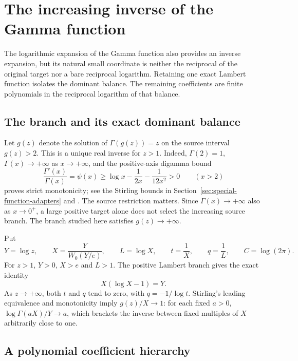 \section{The increasing inverse of the Gamma function}
\label{sec:gamma-inverse}

The logarithmic expansion of the Gamma function also provides an inverse
expansion, but its natural small coordinate is neither the reciprocal of
the original target nor a bare reciprocal logarithm. Retaining one exact
Lambert function isolates the dominant balance. The remaining coefficients
are finite polynomials in the reciprocal logarithm of that balance.

\subsection{The branch and its exact dominant balance}

Let $g(z)$ denote the solution of $\Gamma(g(z))=z$ on the source interval
$g(z)>2$. This is a unique real inverse for $z>1$. Indeed, $\Gamma(2)=1$,
$\Gamma(x)\to+\infty$ as $x\to+\infty$, and the positive-axis digamma bound
\[
 \frac{\Gamma'(x)}{\Gamma(x)}=\psi(x)
 \ge \log x-\frac1{2x}-\frac1{12x^2}>0\qquad(x>2)
\]
proves strict monotonicity; see the Stirling bounds in
Section~\ref{sec:special-function-adapters} and \cite[\S5.11]{dlmf}.
The source restriction matters. Since $\Gamma(x)\to+\infty$ also as
$x\to0^+$, a large positive target alone does not select the increasing
source branch. The branch studied here satisfies $g(z)\to+\infty$.

Put
\begin{equation}
 Y=\log z,\qquad
 X=\frac{Y}{W_0(Y/e)},\qquad L=\log X,\qquad
 t=\frac1X,\qquad q=\frac1L,\qquad C=\log(2\pi).
 \label{eq:gamma-inverse-coordinate}
\end{equation}
For $z>1$, $Y>0$, $X>e$ and $L>1$. The positive Lambert branch gives
the exact identity
\[
 X(\log X-1)=Y.
\]
As $z\to+\infty$, both $t$ and $q$ tend to zero, with
$q=-1/\log t$. Stirling's leading equivalence and monotonicity imply
$g(z)/X\to1$: for each fixed $a>0$,
$\log\Gamma(aX)/Y\to a$, which brackets the inverse between fixed
multiples of $X$ arbitrarily close to one.

\subsection{A polynomial coefficient hierarchy}

